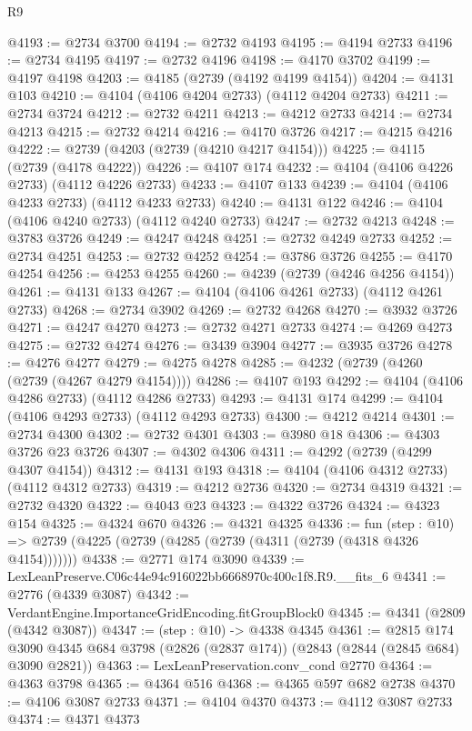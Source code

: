 \begin{lexlean}{R9}
\begin{coremodule}
@4193 := @2734 @3700
@4194 := @2732 @4193
@4195 := @4194 @2733
@4196 := @2734 @4195
@4197 := @2732 @4196
@4198 := @4170 @3702
@4199 := @4197 @4198
@4203 := @4185 (@2739 (@4192 @4199 @4154))
@4204 := @4131 @103
@4210 := @4104 (@4106 @4204 @2733) (@4112 @4204 @2733)
@4211 := @2734 @3724
@4212 := @2732 @4211
@4213 := @4212 @2733
@4214 := @2734 @4213
@4215 := @2732 @4214
@4216 := @4170 @3726
@4217 := @4215 @4216
@4222 := @2739 (@4203 (@2739 (@4210 @4217 @4154)))
@4225 := @4115 (@2739 (@4178 @4222))
@4226 := @4107 @174
@4232 := @4104 (@4106 @4226 @2733) (@4112 @4226 @2733)
@4233 := @4107 @133
@4239 := @4104 (@4106 @4233 @2733) (@4112 @4233 @2733)
@4240 := @4131 @122
@4246 := @4104 (@4106 @4240 @2733) (@4112 @4240 @2733)
@4247 := @2732 @4213
@4248 := @3783 @3726
@4249 := @4247 @4248
@4251 := @2732 @4249 @2733
@4252 := @2734 @4251
@4253 := @2732 @4252
@4254 := @3786 @3726
@4255 := @4170 @4254
@4256 := @4253 @4255
@4260 := @4239 (@2739 (@4246 @4256 @4154))
@4261 := @4131 @133
@4267 := @4104 (@4106 @4261 @2733) (@4112 @4261 @2733)
@4268 := @2734 @3902
@4269 := @2732 @4268
@4270 := @3932 @3726
@4271 := @4247 @4270
@4273 := @2732 @4271 @2733
@4274 := @4269 @4273
@4275 := @2732 @4274
@4276 := @3439 @3904
@4277 := @3935 @3726
@4278 := @4276 @4277
@4279 := @4275 @4278
@4285 := @4232 (@2739 (@4260 (@2739 (@4267 @4279 @4154))))
@4286 := @4107 @193
@4292 := @4104 (@4106 @4286 @2733) (@4112 @4286 @2733)
@4293 := @4131 @174
@4299 := @4104 (@4106 @4293 @2733) (@4112 @4293 @2733)
@4300 := @4212 @4214
@4301 := @2734 @4300
@4302 := @2732 @4301
@4303 := @3980 @18
@4306 := @4303 @3726 @23 @3726
@4307 := @4302 @4306
@4311 := @4292 (@2739 (@4299 @4307 @4154))
@4312 := @4131 @193
@4318 := @4104 (@4106 @4312 @2733) (@4112 @4312 @2733)
@4319 := @4212 @2736
@4320 := @2734 @4319
@4321 := @2732 @4320
@4322 := @4043 @23
@4323 := @4322 @3726
@4324 := @4323 @154
@4325 := @4324 @670
@4326 := @4321 @4325
@4336 := fun (step : @10) =>
  @2739 (@4225 (@2739 (@4285 (@2739 (@4311 (@2739 (@4318 @4326 @4154)))))))
@4338 := @2771 @174 @3090
@4339 := LexLeanPreserve.C06c44e94c916022bb6668970c400c1f8.R9.__fits_6
@4341 := @2776 (@4339 @3087)
@4342 := VerdantEngine.ImportanceGridEncoding.fitGroupBlock0
@4345 := @4341 (@2809 (@4342 @3087))
@4347 := (step : @10) -> @4338 @4345
@4361 := @2815
    @174
    @3090
    @4345
    @684
    @3798
    (@2826 (@2837 @174))
    (@2843 (@2844 (@2845 @684) @3090 @2821))
@4363 := LexLeanPreservation.conv_cond @2770
@4364 := @4363 @3798
@4365 := @4364 @516
@4368 := @4365 @597 @682 @2738
@4370 := @4106 @3087 @2733
@4371 := @4104 @4370
@4373 := @4112 @3087 @2733
@4374 := @4371 @4373

\end{coremodule}
\end{lexlean}
